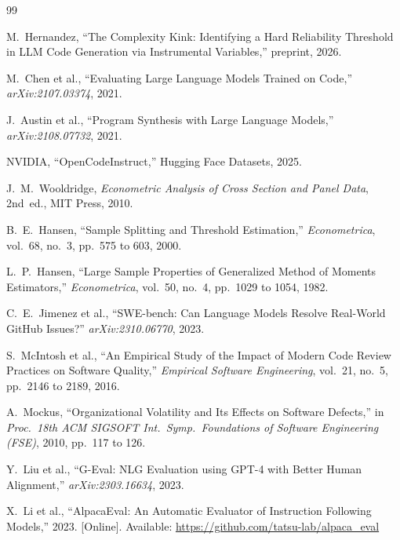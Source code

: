 \documentclass[conference]{IEEEtran}
\begin{document}

\begin{thebibliography}{99}

M.~Hernandez, ``The Complexity Kink: Identifying a Hard Reliability Threshold in LLM Code Generation via Instrumental Variables,'' preprint, 2026.

M.~Chen et al., ``Evaluating Large Language Models Trained on Code,'' \emph{arXiv:2107.03374}, 2021.

J.~Austin et al., ``Program Synthesis with Large Language Models,'' \emph{arXiv:2108.07732}, 2021.

NVIDIA, ``OpenCodeInstruct,'' Hugging Face Datasets, 2025.

J.~M.~Wooldridge, \emph{Econometric Analysis of Cross Section and Panel Data}, 2nd~ed., MIT Press, 2010.

B.~E.~Hansen, ``Sample Splitting and Threshold Estimation,'' \emph{Econometrica}, vol.~68, no.~3, pp.~575 to 603, 2000.

L.~P.~Hansen, ``Large Sample Properties of Generalized Method of Moments Estimators,'' \emph{Econometrica}, vol.~50, no.~4, pp.~1029 to 1054, 1982.

C.~E.~Jimenez et al., ``SWE-bench: Can Language Models Resolve Real-World GitHub Issues?'' \emph{arXiv:2310.06770}, 2023.

S.~McIntosh et al., ``An Empirical Study of the Impact of Modern Code Review Practices on Software Quality,'' \emph{Empirical Software Engineering}, vol.~21, no.~5, pp.~2146 to 2189, 2016.

A.~Mockus, ``Organizational Volatility and Its Effects on Software Defects,'' in \emph{Proc.\ 18th ACM SIGSOFT Int.\ Symp.\ Foundations of Software Engineering (FSE)}, 2010, pp.~117 to 126.

Y.~Liu et al., ``G-Eval: NLG Evaluation using GPT-4 with Better Human Alignment,'' \emph{arXiv:2303.16634}, 2023.

X.~Li et al., ``AlpacaEval: An Automatic Evaluator of Instruction Following Models,'' 2023. [Online]. Available: \url{https://github.com/tatsu-lab/alpaca_eval}


\end{thebibliography}
\end{document}
